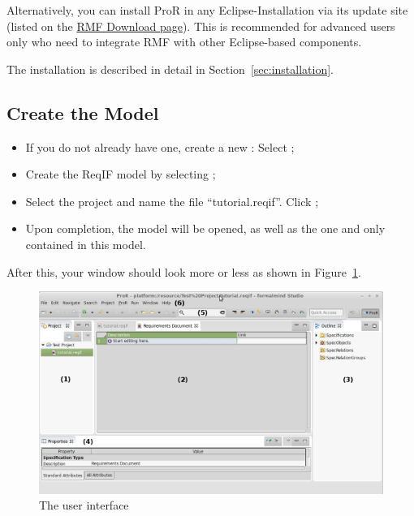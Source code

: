  Alternatively, you can install ProR in any Eclipse-Installation via its update site (listed on the \href{https://www.eclipse.org/rmf/download.php}{RMF Download page}).  This is recommended for advanced users only who need to integrate RMF with other Eclipse-based components.

\begin{info}
The installation is described in detail in Section~\ref{sec:installation}.
\end{info}

\subsection{Create the Model}

\begin{itemize}

\item
  If you do not already have one, create a new : Select  ;
\item
  Create the ReqIF model by selecting ;
\item
  Select the project and name the file ``tutorial.reqif''.  Click ;
\item
  Upon completion, the model will be opened, as well as the one and only  contained in this model.
\end{itemize}

After this, your window should look more or less as shown in Figure~\ref{fig:pror_gui}.

\begin{figure}
  \centering
  \includegraphics[width=\linewidth]{../rmf-images/Screenshot_intro.png}
  \caption{The \pror{} user interface}
  \label{fig:pror_gui}
\end{figure}

